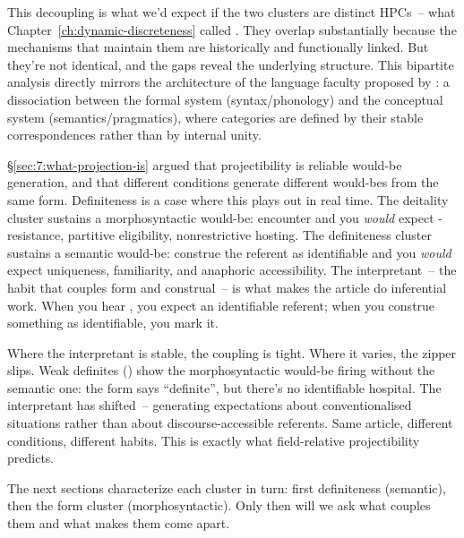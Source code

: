 This decoupling is what we'd expect if the two clusters are distinct HPCs~-- what Chapter~\ref{ch:dynamic-discreteness} called . They overlap substantially because the mechanisms that maintain them are historically and functionally linked. But they're not identical, and the gaps reveal the underlying structure. This bipartite analysis directly mirrors the architecture of the language faculty proposed by \textcite{jackendoff2002}: a dissociation between the formal system (syntax/phonology) and the conceptual system (semantics/pragmatics), where categories are defined by their stable correspondences rather than by internal unity.

§\ref{sec:7:what-projection-is} argued that projectibility is reliable would-be generation, and that different conditions generate different would-bes from the same form. Definiteness is a case where this plays out in real time. The deitality cluster sustains a morphosyntactic would-be: encounter  and you \emph{would} expect -resistance, partitive eligibility, nonrestrictive hosting. The definiteness cluster sustains a semantic would-be: construe the referent as identifiable and you \emph{would} expect uniqueness, familiarity, and anaphoric accessibility. The interpretant~-- the habit that couples form and construal~-- is what makes the article do inferential work. When you hear , you expect an identifiable referent; when you construe something as identifiable, you mark it.

Where the interpretant is stable, the coupling is tight. Where it varies, the zipper slips. Weak definites () show the morphosyntactic would-be firing without the semantic one: the form says \enquote{definite}, but there's no identifiable hospital. The interpretant has shifted~-- generating expectations about conventionalised situations rather than about discourse-accessible referents. Same article, different conditions, different habits. This is exactly what field-relative projectibility predicts.

The next sections characterize each cluster in turn: first definiteness (semantic), then the form cluster (morphosyntactic). Only then will we ask what couples them and what makes them come apart.

